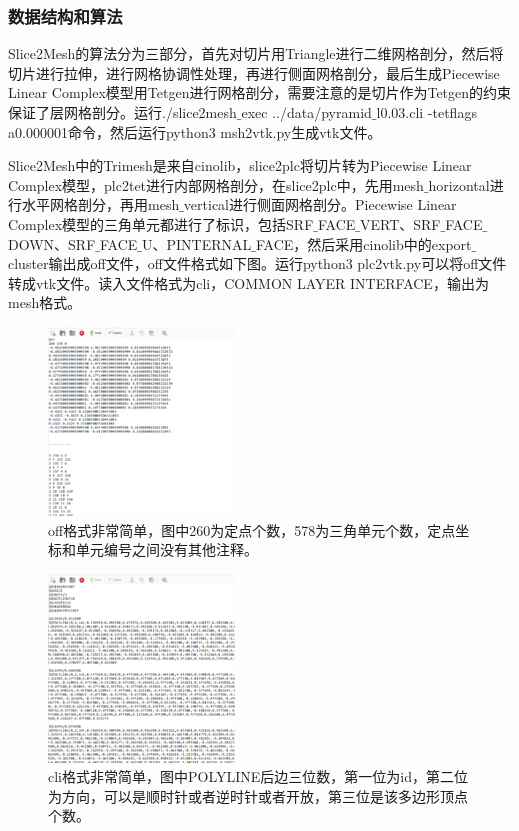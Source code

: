 \subsubsection{数据结构和算法}

Slice2Mesh的算法分为三部分，首先对切片用Triangle进行二维网格剖分，然后将切片进行拉伸，进行网格协调性处理，再进行侧面网格剖分，最后生成Piecewise Linear Complex模型用Tetgen进行网格剖分，需要注意的是切片作为Tetgen的约束保证了层网格剖分。运行./slice2mesh$\_$exec ../data/pyramid$\_$l0.03.cli -tetflags a0.000001命令，然后运行python3 msh2vtk.py生成vtk文件。

Slice2Mesh中的Trimesh是来自cinolib，slice2plc将切片转为Piecewise Linear Complex模型，plc2tet进行内部网格剖分，在slice2plc中，先用mesh$\_$horizontal进行水平网格剖分，再用mesh$\_$vertical进行侧面网格剖分。Piecewise Linear Complex模型的三角单元都进行了标识，包括SRF$\_$FACE$\_$VERT、SRF$\_$FACE$\_$DOWN、SRF$\_$FACE$\_$U、PINTERNAL$\_$FACE，然后采用cinolib中的export$\_$cluster输出成off文件，off文件格式如下图。运行python3 plc2vtk.py可以将off文件转成vtk文件。读入文件格式为cli，COMMON LAYER INTERFACE，输出为mesh格式。

\begin{figure}[!htbp]
  \centering
  \includegraphics[height=5cm]{fig/1/1.1.7.1:0.png}
  \caption{off格式非常简单，图中260为定点个数，578为三角单元个数，定点坐标和单元编号之间没有其他注释。}
  \label{fig:1-7}
\end{figure}

\begin{figure}[!htbp]
  \centering
  \includegraphics[height=5cm]{fig/1/1.1.7.1:00.png}
  \caption{cli格式非常简单，图中POLYLINE后边三位数，第一位为id，第二位为方向，可以是顺时针或者逆时针或者开放，第三位是该多边形顶点个数。}
  \label{fig:1-7}
\end{figure}


